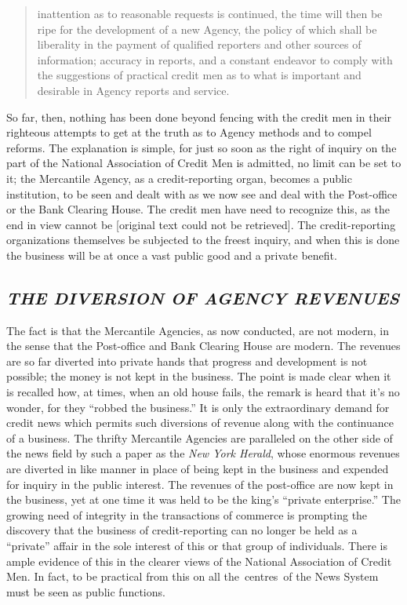 \documentclass[openany,nobib]{tufte-book}
\begin{document}
\begin{quote}
inattention as to reasonable requests is continued, the time will then
be ripe for the development of a new Agency, the policy of which shall
be liberality in the payment of qualified reporters and other sources of
information; accuracy in reports, and a constant endeavor to comply with
the suggestions of practical credit men as to what is important and
desirable in Agency reports and service.
\end{quote}

So far, then, nothing has been done beyond fencing with the credit men
in their righteous attempts to get at the truth as to Agency methods and
to compel reforms. The explanation is simple, for just so soon as the
right of inquiry on the part of the National Association of Credit Men
is admitted, no limit can be set to it; the Mercantile Agency, as a
credit-reporting organ, becomes a public institution, to be seen and
dealt with as we now see and deal with the Post-office or the Bank
Clearing House. The credit men have need to recognize this, as the end
in view cannot be {[}original text could not be retrieved{]}. The
credit-reporting organizations themselves be subjected to the freest
inquiry, and when this is done the business will be at once a vast
public good and a private benefit.~

\hypertarget{the-diversion-of-agency-revenues}{%
\subsection{\texorpdfstring{\emph{THE DIVERSION OF AGENCY
REVENUES}}{THE DIVERSION OF AGENCY REVENUES}}\label{the-diversion-of-agency-revenues}}

The fact is that the Mercantile Agencies, as now conducted, are not
modern, in the sense that the Post-office and Bank Clearing House are
modern. The revenues are so far diverted into private hands that
progress and development is not possible; the money is not kept in the
business. The point is made clear when it is recalled how, at times,
when an old house fails, the remark is heard that it's no wonder, for
they ``robbed the business.'' It is only the extraordinary demand for
credit news which permits such diversions of revenue along with the
continuance of a business. The thrifty Mercantile Agencies are
paralleled on the other side of the news field by such a paper as the
\emph{New York Herald}, whose enormous revenues are diverted in like
manner in place of being kept in the business and expended for inquiry
in the public interest. The revenues of the post-office are now kept in
the business, yet at one time it was held to be the king's ``private
enterprise.'' The growing need of integrity in the transactions of
commerce is prompting the discovery that the business of
credit-reporting can no longer be held as a ``private'' affair in the
sole interest of this or that group of individuals. There is ample
evidence of this in the clearer views of the National Association of
Credit Men. In fact, to be practical from this on all the~centres~of the
News System must be seen as public functions.~
\end{document}
